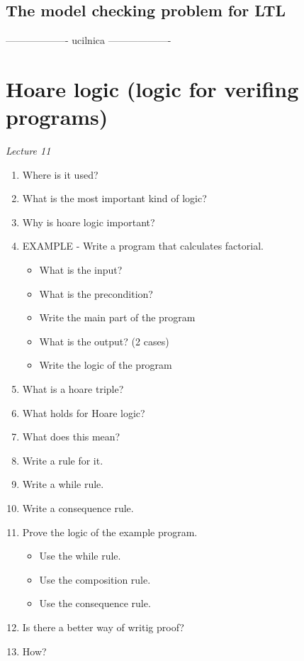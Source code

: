\documentclass[fleqn]{article}
\begin{document}
\subsection{The model checking problem for LTL}
------------------- ucilnica -------------------


\section{Hoare logic (logic for verifing programs)}
\textit{Lecture 11}
\begin{enumerate}
    \item Where is it used?
    \item What is the most important kind of logic?
    \item Why is hoare logic important?
    \item EXAMPLE - Write a program that calculates factorial.
    \begin{itemize}
        \item What is the input?
        \item What is the precondition?
        \item Write the main part of the program
        \item What is the output? (2 cases)
        \item Write the logic of the program
    \end{itemize}
    \item What is a hoare triple?
    \item What holds for Hoare logic?
    \item What does this mean?
    \item Write a rule for it.
    \item Write a while rule.
    \item Write a consequence rule.
    \item Prove the logic of the example program.
    \begin{itemize}
        \item Use the while rule.
        \item Use the composition rule.
        \item Use the consequence rule.
    \end{itemize}
    \item Is there a better way of writig proof?
    \item How?
\end{enumerate}
\end{document}
